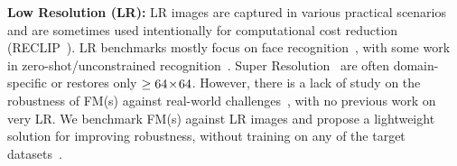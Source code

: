 \noindent \textbf{Low Resolution (LR):}
LR images are captured in various practical scenarios and are sometimes used intentionally for computational cost reduction (RECLIP~\citep{li2023reclip}). LR benchmarks mostly focus on face recognition~\citep{9432821, li2018face}, with some work in zero-shot/unconstrained recognition~\citep{8600370, cheng2019low}. 
Super Resolution~\citep{ohtani2024rethinking, gao2023implicit} are often domain-specific or restores only $\ge64\!\times\!64$. 
However, there is a lack of study on the robustness of FM(s) against real-world challenges~\citep{Xu2024}, with no previous work on very LR. 
We benchmark FM(s) against LR images and propose a lightweight solution for improving robustness, without training on any of the target datasets~\citep{chen2024robustsam}.
\vspace{-7pt}